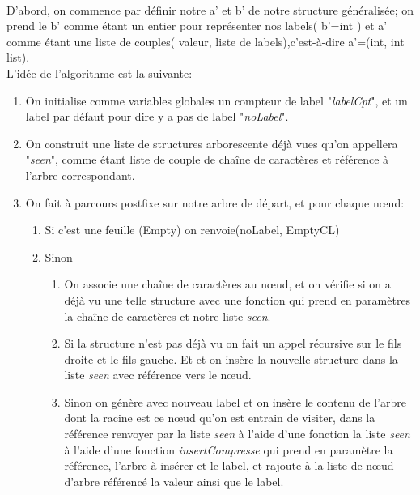     \paragraph{}
    D'abord, on commence par définir notre a' et b' de notre structure généralisée; on prend le b' comme étant un entier pour représenter nos labels( b'=int ) et a' comme étant une liste de couples( valeur, liste de labels),c'est-à-dire a'=(int, int list).\\
    L'idée de l'algorithme est la suivante:
    \begin{enumerate}
        \item On initialise comme variables globales un compteur de label "\textit{labelCpt}", et un label par défaut pour dire y a pas de label "\textit{noLabel}".
        \item On construit une liste de structures arborescente déjà vues qu'on appellera "\textit{seen}", comme étant liste de couple de chaîne de caractères et référence à l'arbre correspondant.
        \item On fait à parcours postfixe sur notre arbre de départ, et pour chaque nœud:
        \begin{enumerate}
            \item Si c'est une feuille (Empty) on renvoie(noLabel, EmptyCL)
            \item Sinon
                \begin{enumerate}
                    \item On associe une chaîne de caractères au nœud, et on vérifie si on a déjà vu une telle structure avec une fonction qui prend en paramètres la chaîne de caractères et notre liste \textit{seen}.
                    \item Si la structure n'est pas déjà vu on fait un appel récursive sur le fils droite et le fils gauche. Et et on insère la nouvelle structure dans la liste \textit{seen} avec référence vers le nœud.
                    \item Sinon on génère avec nouveau label et on insère le contenu de l'arbre dont la racine est ce nœud qu'on est entrain de visiter, dans la référence renvoyer par la liste \textit{seen} à l'aide d'une fonction la liste \textit{seen} à l'aide d'une fonction \textit{insertCompresse} qui prend en paramètre la référence, l'arbre à insérer et le label, et rajoute à la liste de nœud d'arbre référencé la valeur ainsi que le label.
                \end{enumerate}
        \end{enumerate}
    \end{enumerate}
